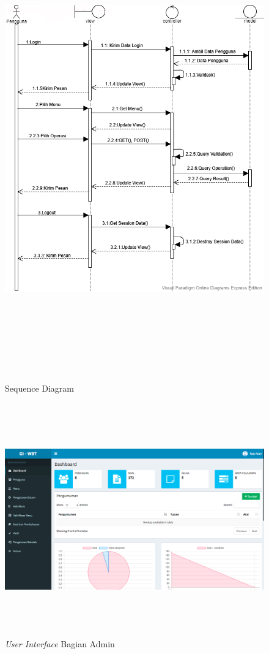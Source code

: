 \documentclass{scrreprt}
\begin{document}
		\begin{figure}
			\includegraphics[width=17cm, height=20cm]{Sequence-diagram.png}
			\caption{Sequence Diagram}
		\end{figure}		
		
		\begin{figure}
			\includegraphics[width=17cm, height=10cm]{admin2.png}
			\caption{\emph{User Interface} Bagian Admin}
		\end{figure}	
	
\end{document}
